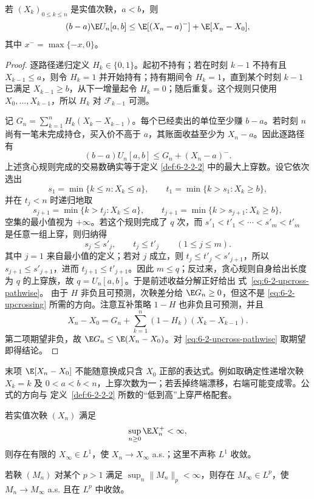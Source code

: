\begin{theorem}\label{theorem:6-2-2-3}
若 $(X_k)_{0\le k\le n}$ 是实值次鞅，$a<b$，则
\begin{equation}\label{eq:6-2-upcrossing}
 (b-a)\E U_n[a,b]
 \le \E[(X_n-a)^-]+\E[X_n-X_0],
\end{equation}
其中 $x^- =\max\{-x,0\}$。
\end{theorem}

\begin{proof}
逐路径递归定义 $H_k\in\{0,1\}$。起初不持有；若在时刻 $k-1$ 不持有且
$X_{k-1}\le a$，则令 $H_k=1$ 并开始持有；持有期间令 $H_k=1$，直到某个时刻
$k-1$ 已满足 $X_{k-1}\ge b$，从下一增量起令 $H_k=0$；随后重复。这个规则只使用
$X_0,\ldots,X_{k-1}$，所以 $H_k$ 对 $\mathcal F_{k-1}$ 可测。

记 $G_n=\sum_{k=1}^nH_k(X_k-X_{k-1})$。每个已经卖出的单位至少赚 $b-a$。若时刻
$n$ 尚有一笔未完成持仓，买入价不高于 $a$，其账面收益至少为 $X_n-a$。因此逐路径有
\begin{equation}\label{eq:6-2-upcross-pathwise}
  (b-a)U_n[a,b]\le G_n+(X_n-a)^-.
\end{equation}
上述贪心规则完成的交易数确实等于定义
\ref{def:6-2-2-2} 中的最大上穿数。设它依次选出
\[
 s_1=\min\{k\le n:X_k\le a\},\qquad
 t_1=\min\{k>s_1:X_k\ge b\},
\]
并在 $t_j<n$ 时递归地取
\[
 s_{j+1}=\min\{k>t_j:X_k\le a\},\qquad
 t_{j+1}=\min\{k>s_{j+1}:X_k\ge b\},
\]
空集的最小值视为 $+\infty$。若这个规则完成了 $q$ 次，而
$s'_1<t'_1<\cdots<s'_m<t'_m$ 是任意一组上穿，则归纳得
\[
 s_j\le s'_j,\qquad t_j\le t'_j\qquad(1\le j\le m).
\]
其中 $j=1$ 来自最小值的定义；若对 $j$ 成立，则
$t_j\le t'_j<s'_{j+1}$，所以 $s_{j+1}\le s'_{j+1}$，进而
$t_{j+1}\le t'_{j+1}$。因此 $m\le q$；反过来，贪心规则自身给出长度为 $q$ 的上穿族，故
$q=U_n[a,b]$。于是前述收益分解正好给出
式~\eqref{eq:6-2-upcross-pathwise}。
由于 $H$ 非负且可预测，次鞅差分给 $\E G_n\ge0$，但这不是
\eqref{eq:6-2-upcrossing} 所需的方向。注意互补策略 $1-H$ 也非负且可预测，并且
\[
  X_n-X_0=G_n+
  \sum_{k=1}^n(1-H_k)(X_k-X_{k-1}).
\]
第二项期望非负，故 $\E G_n\le\E(X_n-X_0)$。对
\eqref{eq:6-2-upcross-pathwise} 取期望即得结论。
\end{proof}

末项 $\E[X_n-X_0]$ 不能随意换成只含 $X_0$ 正部的表达式。例如取确定性递增次鞅
$X_k=k$ 及 $0<a<b<n$，上穿次数为一；若丢掉终端漂移，右端可能变成零。公式的方向与
定义~\ref{def:6-2-2-2} 所数的“低到高”上穿严格配套。

\begin{theorem}[鞅／次鞅收敛定理]\label{theorem:6-2-2-4}
若实值次鞅 $(X_n)$ 满足
\[
  \sup_{n\ge0}\E X_n^+<\infty,
\]
则存在有限的 $X_\infty\in L^1$，使 $X_n\to X_\infty$ a.s.；这里不声称
$L^1$ 收敛。

若鞅 $(M_n)$ 对某个 $p>1$ 满足 $\sup_n\|M_n\|_p<\infty$，则存在
$M_\infty\in L^p$，使 $M_n\to M_\infty$ a.s. 且在 $L^p$ 中收敛。
\end{theorem}

